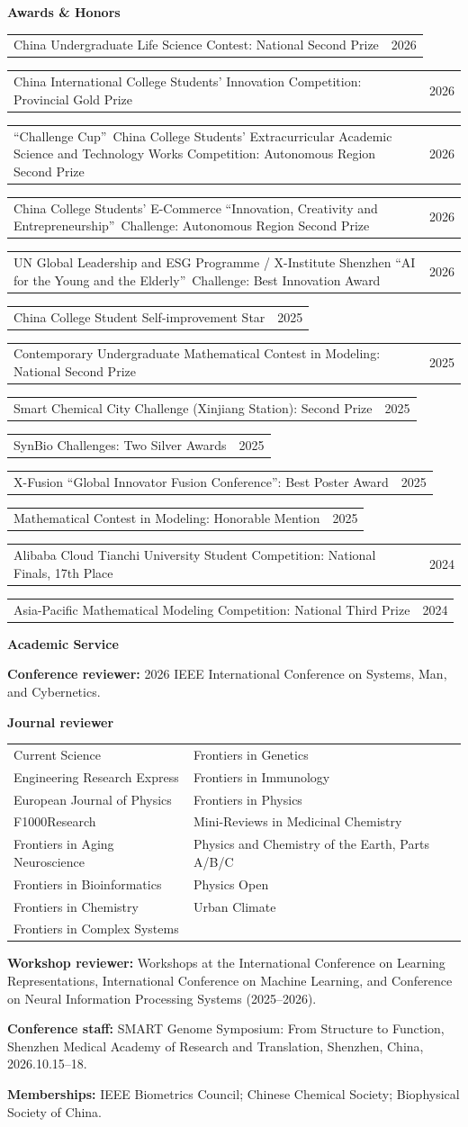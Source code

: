 \documentclass[11pt,a4paper]{article}
\makeatletter
\newcommand{\cvsection}[1]{%
  \par\addvspace{9pt}\Needspace{46pt}%
  {\centering\bfseries\fontsize{12}{14.5}\selectfont #1\par}%
  \nobreak\vspace{5pt}}
\newlength{\datedlinegap}
\newcommand{\datedline}[2]{%
  \Needspace{28pt}%
  \begin{tabularx}{\linewidth}{@{}>{\raggedright\arraybackslash}X@{\hspace{14pt}}r@{}}#1 & #2\end{tabularx}\par\vspace{\datedlinegap}}
\newcommand{\serviceitem}[2]{%
  \Needspace{32pt}\textbf{#1:} #2\par\vspace{8pt}}
\makeatother
\begin{document}
\newpage
\setlength{\datedlinegap}{8pt}
\cvsection{Awards \& Honors}
\datedline{China Undergraduate Life Science Contest: National Second Prize}{2026}
\datedline{China International College Students' Innovation Competition: Provincial Gold Prize}{2026}
\datedline{\textquotedblleft Challenge Cup\textquotedblright\ China College Students' Extracurricular Academic Science and Technology Works Competition: Autonomous Region Second Prize}{2026}
\datedline{China College Students' E-Commerce \textquotedblleft Innovation, Creativity and Entrepreneurship\textquotedblright\ Challenge: Autonomous Region Second Prize}{2026}
\datedline{UN Global Leadership and ESG Programme / X-Institute Shenzhen \textquotedblleft AI for the Young and the Elderly\textquotedblright\ Challenge: Best Innovation Award}{2026}
\datedline{China College Student Self-improvement Star}{2025}
\datedline{Contemporary Undergraduate Mathematical Contest in Modeling: National Second Prize}{2025}
\datedline{Smart Chemical City Challenge (Xinjiang Station): Second Prize}{2025}
\datedline{SynBio Challenges: Two Silver Awards}{2025}
\datedline{X-Fusion \textquotedblleft Global Innovator Fusion Conference\textquotedblright: Best Poster Award}{2025}
\datedline{Mathematical Contest in Modeling: Honorable Mention}{2025}
\datedline{Alibaba Cloud Tianchi University Student Competition: National Finals, 17th Place}{2024}
\datedline{Asia-Pacific Mathematical Modeling Competition: National Third Prize}{2024}

\cvsection{Academic Service}
\serviceitem{Conference reviewer}{2026 IEEE International Conference on Systems, Man, and Cybernetics.}
\Needspace{108pt}\textbf{Journal reviewer}\par\vspace{3pt}
{\renewcommand{\arraystretch}{1.2}%
\begin{tabularx}{\linewidth}{@{}>{\raggedright\arraybackslash}X@{\hspace{18pt}}>{\raggedright\arraybackslash}X@{}}
Current Science & Frontiers in Genetics \\
Engineering Research Express & Frontiers in Immunology \\
European Journal of Physics & Frontiers in Physics \\
F1000Research & Mini-Reviews in Medicinal Chemistry \\
Frontiers in Aging Neuroscience & Physics and Chemistry of the Earth, Parts A/B/C \\
Frontiers in Bioinformatics & Physics Open \\
Frontiers in Chemistry & Urban Climate \\
Frontiers in Complex Systems &
\end{tabularx}\par}\vspace{5pt}
\serviceitem{Workshop reviewer}{Workshops at the International Conference on Learning Representations,
International Conference on Machine Learning, and Conference on Neural Information Processing Systems (2025--2026).}
\serviceitem{Conference staff}{SMART Genome Symposium: From Structure to Function,
Shenzhen Medical Academy of Research and Translation, Shenzhen, China, 2026.10.15--18.}
\serviceitem{Memberships}{IEEE Biometrics Council; Chinese Chemical Society; Biophysical Society of China.}
\end{document}
